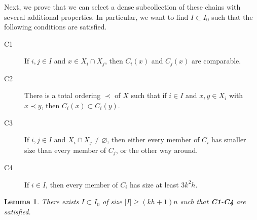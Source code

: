 \documentclass[11pt]{article}
\newtheorem{lemma}[lemma]{Lemma}
\theoremstyle{definition}
\begin{document}
Next, we prove that we can select a dense subcollection of these chains with several additional properties. In particular, we want to find $I\subset I_0$ such that the following conditions are satisfied.
\begin{description}
    \item[C1] If $i,j\in I$ and $x\in X_i\cap X_j$, then $C_i(x)$ and $C_j(x)$ are comparable.
    \item[C2] There is a total ordering $\prec$ of $X$ such that if $i\in I$ and $x,y\in X_i$ with $x\prec y$, then $C_i(x)\subset C_i(y)$.
    \item[C3] If $i,j\in I$ and $X_i\cap X_j\neq \varnothing$, then either every member of $C_i$ has smaller size than every member of $C_j$, or the other way around.
    \item[C4] If $i\in I$, then every member of $C_i$ has size at least $3k^2h$.
\end{description}

\begin{lemma}
    There exists $I\subset I_0$ of size $|I|\geq (kh+1)n$ such that \textbf{C1}-\textbf{C4} are satisfied.
\end{lemma}
\end{document}
